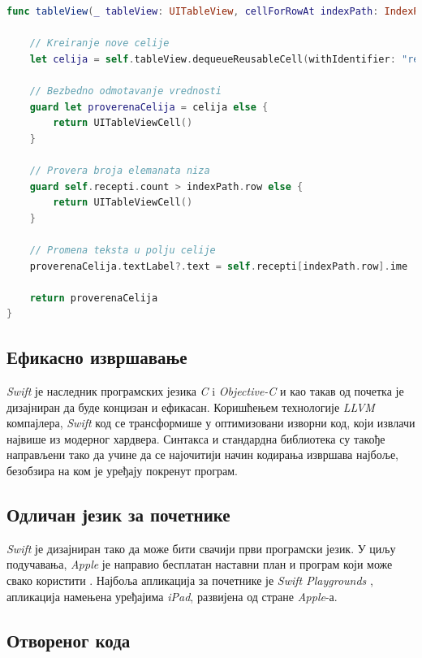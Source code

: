 \documentclass[12pt,oneside]{memoir}
\begin{document}
\begin{lstlisting}[caption=\textit{{Коришћење опционе променљиве}}, label={lst:Опциона променљива}, language=Swift, frame=single]
func tableView(_ tableView: UITableView, cellForRowAt indexPath: IndexPath) -> UITableViewCell {
        
    // Kreiranje nove celije
    let celija = self.tableView.dequeueReusableCell(withIdentifier: "receptCelija") as? UITableViewCell
    
    // Bezbedno odmotavanje vrednosti
    guard let proverenaCelija = celija else {
        return UITableViewCell()
    }
    
    // Provera broja elemanata niza
    guard self.recepti.count > indexPath.row else {
        return UITableViewCell()
    }
    
    // Promena teksta u polju celije
    proverenaCelija.textLabel?.text = self.recepti[indexPath.row].ime
    
    return proverenaCelija
}

\end{lstlisting}

\subsection{Ефикасно извршавање}

\indent \textit{Swift} је наследник програмских језика \textit{C} i \textit{Objective-C} и као такав од почетка је дизајниран да буде концизан и ефикасан. Коришћењем технологије \textit{LLVM} компајлера, \textit{Swift} код се трансформише у оптимизовани изворни код, који извлачи највише из модерног хардвера. Синтакса и стандардна библиотека су такође направљени тако да учине да се најочитији начин кодирања извршава најбоље, безобзира на ком је уређају покренут програм.

\subsection{Одличан језик за почетнике}

\textit{Swift} је дизајниран тако да може бити свачији први програмски језик. У циљу подучавања, \textit{Apple} је направио бесплатан наставни план и програм који може свако користити \cite{Swift_Education}. Најбоља апликација за почетнике је \textit{Swift Playgrounds} \cite{Swift_Playground}, апликација намењена уређајима \textit{iPad}, развијена од стране \textit{Apple}-а. 

\subsection{Отвореног кода}
\end{document}
